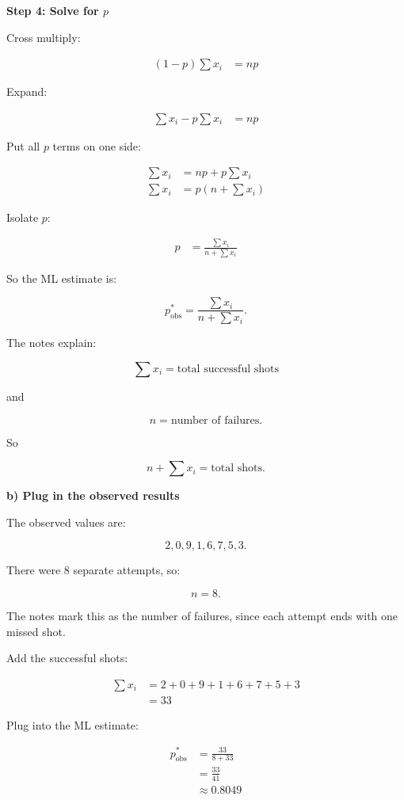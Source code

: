\documentclass[10pt]{article}
\begin{document}
\textbf{Step 4: Solve for $p$}

Cross multiply:

\begin{align*}
(1-p)\sum x_i
&=
np
\end{align*}

Expand:

\begin{align*}
\sum x_i
-p\sum x_i
&=
np
\end{align*}

Put all $p$ terms on one side:

\begin{align*}
\sum x_i
&=
np+p\sum x_i \\[2mm]
\sum x_i
&=
p\left(n+\sum x_i\right)
\end{align*}

Isolate $p$:

\begin{align*}
p
&=
\frac{\sum x_i}
{n+\sum x_i}
\end{align*}

So the ML estimate is:

\[
p^*_{\mathrm{obs}}
=
\frac{\sum x_i}
{n+\sum x_i}.
\]

The notes explain:

\[
\sum x_i
= \text{total successful shots}
\]

and

\[
n
= \text{number of failures}.
\]

So

\[
n+\sum x_i
= \text{total shots}.
\]

\textbf{b) Plug in the observed results}

The observed values are:

\[
2,0,9,1,6,7,5,3.
\]

There were 8 separate attempts, so:

\[
n=8.
\]

The notes mark this as the number of failures, since each attempt
ends with one missed shot.

Add the successful shots:

\begin{align*}
\sum x_i
&=
2+0+9+1+6+7+5+3 \\[2mm]
&=33
\end{align*}

Plug into the ML estimate:

\begin{align*}
p^*_{\mathrm{obs}}
&=
\frac{33}{8+33} \\[2mm]
&=
\frac{33}{41} \\[2mm]
&\approx 0.8049
\end{align*}
\end{document}
